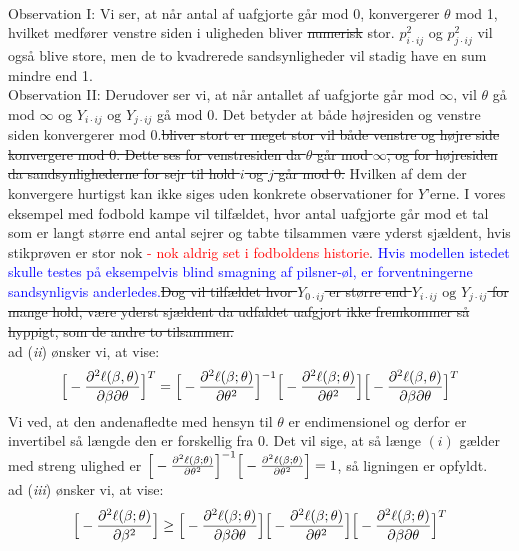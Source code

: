 \documentclass[11pt,a4paper]{article}
\begin{document}
\\Observation I: Vi ser, at når antal af uafgjorte går mod 0, konvergerer $\theta$ mod 1, hvilket medfører venstre siden i uligheden bliver \sout{numerisk} stor. $p_{i\cdot ij}^2$ og $p_{j\cdot ij}^2$ vil også blive store, men de to kvadrerede sandsynligheder vil stadig have en sum mindre end 1.\\
Observation II: Derudover ser vi, at når antallet af uafgjorte går mod $\infty$, vil $\theta$ gå mod $\infty$ og $Y_{i \cdot ij} \text{ og } Y_{j \cdot ij}$ gå mod 0. Det betyder at både højresiden og venstre siden konvergerer mod 0.\sout{bliver stort er meget stor vil både venstre og højre side konvergere mod 0. Dette ses for venstresiden da $\theta$ går mod  $\infty$, og for højresiden da sandsynlighederne for sejr til hold $i$ og $j$ går mod 0.} Hvilken af dem der konvergere hurtigst kan ikke siges uden konkrete observationer for $Y$'erne. I vores eksempel med fodbold kampe vil tilfældet, hvor antal uafgjorte går mod et tal som er langt større end antal sejrer og tabte tilsammen være yderst sjældent, hvis stikprøven er stor nok \textcolor{red}{- nok aldrig set i fodboldens historie}. \textcolor{blue}{Hvis modellen istedet skulle testes på eksempelvis blind smagning af pilsner-øl, er forventningerne sandsynligvis anderledes.}\sout{Dog vil tilfældet hvor $Y_{0 \cdot ij}$ er større end $Y_{i \cdot ij} \text{ og } Y_{j \cdot ij}$ for mange hold, være yderst sjældent da udfaldet uafgjort ikke fremkommer så hyppigt, som de andre to tilsammen.}\\
ad (\textit{ii}) ønsker vi, at vise:
\begin{align*}
\Big{[}-\frac{\partial^2 \ell(\beta,\theta)}{\partial \beta \partial \theta}\Big{]}^T = \Big{[}-\frac{\partial^2 \ell(\beta;\theta)}{\partial \theta^2}\Big{]}^{-1}\Big{[}-\frac{\partial^2 \ell(\beta;\theta)}{\partial \theta^2}\Big{]}\Big{[}-\frac{\partial^2 \ell(\beta,\theta)}{\partial \beta \partial \theta}\Big{]}^T
\end{align*}
Vi ved, at den andenafledte med hensyn til $\theta$ er endimensionel og derfor er invertibel så længde den er forskellig fra 0. Det vil sige, at så længe $(i)$ gælder med streng ulighed er $\Big{[}-\frac{\partial^2 \ell(\beta;\theta)}{\partial \theta^2}\Big{]}^{-1}\Big{[}-\frac{\partial^2 \ell(\beta;\theta)}{\partial \theta^2}\Big{]}=1$, så ligningen er opfyldt.\\
ad (\textit{iii}) ønsker vi, at vise:
\begin{align*}
  \Big{[}-\frac{\partial^2 \ell(\beta;\theta)}{\partial \beta^2}\Big{]} \geq \Big{[}-\frac{\partial^2 \ell(\beta;\theta)}{\partial \beta \partial \theta}\Big{]}\Big{[}-\frac{\partial^2 \ell(\beta;\theta)}{\partial \theta^2}\Big{]}\Big{[}-\frac{\partial^2 \ell(\beta;\theta)}{\partial \beta \partial \theta}\Big{]}^T
\end{align*}
\end{document}
